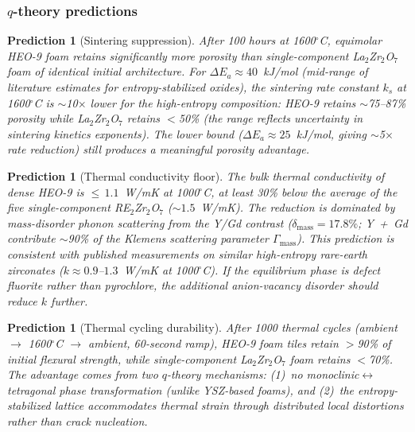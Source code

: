 \documentclass[12pt,letterpaper]{article}
\newtheorem{prediction}[theorem]{Prediction}
\theoremstyle{definition}
\begin{document}
\subsubsection{$q$-theory predictions}

\begin{prediction}[Sintering suppression]\label{pred:foam_sinter}
After 100 hours at 1600$^\circ$C, equimolar HEO-9 foam retains significantly more porosity than single-component La$_2$Zr$_2$O$_7$ foam of identical initial architecture.  For $\Delta E_a \approx 40$~kJ/mol (mid-range of literature estimates for entropy-stabilized oxides), the sintering rate constant $k_s$ at 1600$^\circ$C is $\sim$10$\times$ lower for the high-entropy composition: HEO-9 retains $\sim$75--87\% porosity while La$_2$Zr$_2$O$_7$ retains $<$50\% (the range reflects uncertainty in sintering kinetics exponents).  The lower bound ($\Delta E_a \approx 25$~kJ/mol, giving $\sim$5$\times$ rate reduction) still produces a meaningful porosity advantage.
\end{prediction}

\begin{prediction}[Thermal conductivity floor]\label{pred:foam_conductivity}
The bulk thermal conductivity of dense HEO-9 is ${\leq}\,1.1$~W/mK at 1000$^\circ$C, at least 30\% below the average of the five single-component RE$_2$Zr$_2$O$_7$ (${\sim}1.5$~W/mK).  The reduction is dominated by mass-disorder phonon scattering from the Y/Gd contrast ($\delta_{\mathrm{mass}} = 17.8\%$; Y~+~Gd contribute $\sim$90\% of the Klemens scattering parameter $\Gamma_{\mathrm{mass}}$).  This prediction is consistent with published measurements on similar high-entropy rare-earth zirconates ($k \approx 0.9$--$1.3$~W/mK at 1000$^\circ$C).  If the equilibrium phase is defect fluorite rather than pyrochlore, the additional anion-vacancy disorder should reduce $k$ further.
\end{prediction}

\begin{prediction}[Thermal cycling durability]\label{pred:foam_cycling}
After 1000 thermal cycles (ambient $\to$ 1600$^\circ$C $\to$ ambient, 60-second ramp), HEO-9 foam tiles retain $>$90\% of initial flexural strength, while single-component La$_2$Zr$_2$O$_7$ foam retains $<$70\%.  The advantage comes from two $q$-theory mechanisms: (1)~no monoclinic$\leftrightarrow$tetragonal phase transformation (unlike YSZ-based foams), and (2)~the entropy-stabilized lattice accommodates thermal strain through distributed local distortions rather than crack nucleation.
\end{prediction}
\end{document}
